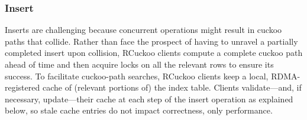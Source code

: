 


\subsubsection{Insert}
\label{sec:insert}

Inserts are challenging because concurrent operations might result in
cuckoo paths that collide.  Rather than face the prospect of having to
unravel a partially completed insert upon collision, RCuckoo clients
compute a complete cuckoo path ahead of time and then acquire locks on
all the relevant rows to ensure its success.  To facilitate
cuckoo-path searches, RCuckoo clients keep a local, RDMA-registered
cache of (relevant portions of) the index table.  Clients
validate---and, if necessary, update---their cache at each step of the
insert operation as explained below, so stale cache entries do not
impact correctness, only performance.






